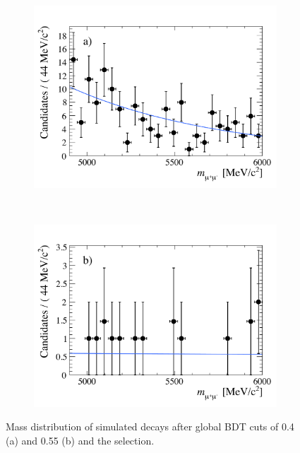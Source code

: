 \begin{figure}[tbp]
    \centering
    \begin{subfigure}[b]{0.48\textwidth}
        \includegraphics[width=\textwidth]{./Figs/Selection/BDT0p4.pdf}
    \end{subfigure}
    ~ %
    \begin{subfigure}[b]{0.48\textwidth}
       \includegraphics[width=\textwidth]{./Figs/Selection/BDT0p55.pdf}
    \end{subfigure}
    \caption{Mass distribution of \bbarmumux simulated decays after global BDT cuts of 0.4 (a) and 0.55 (b) and the \bsmumu selection.}
    \label{fig:BDTmasses}
\end{figure}


